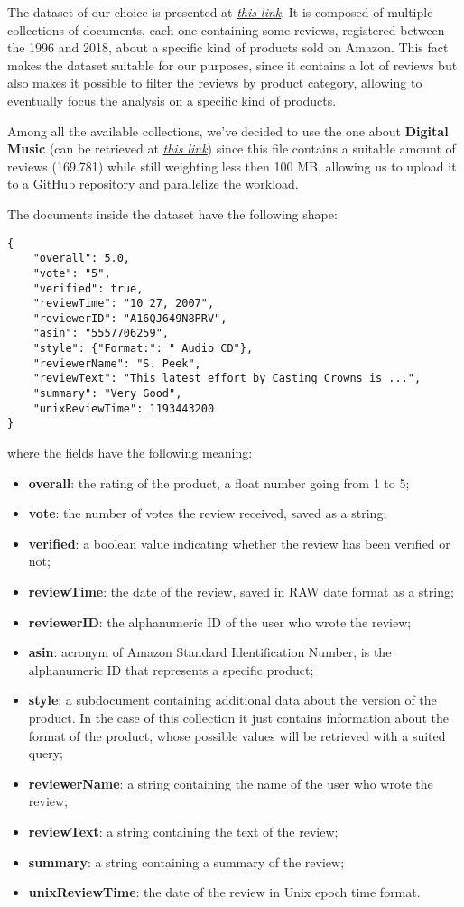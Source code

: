 The dataset of our choice is presented at \href{https://nijianmo.github.io/amazon/index.html}{\textit{this link}}. It is composed of multiple collections of documents, each one containing some reviews, registered between the 1996 and 2018, about a specific kind of products sold on Amazon. This fact makes the dataset suitable for our purposes, since it contains a lot of reviews but also makes it possible to filter the reviews by product category, allowing to eventually focus the analysis on a specific kind of products.

Among all the available collections, we've decided to use the one about \textbf{Digital Music} (can be retrieved at \href{https://jmcauley.ucsd.edu/data/amazon_v2/categoryFilesSmall/Digital_Music_5.json.gz}{\textit{this link}}) since this file contains a suitable amount of reviews (169.781) while still weighting less then 100 MB, allowing us to upload it to a GitHub repository and parallelize the workload.

The documents inside the dataset have the following shape: \\
\begin{verbatim}
{
    "overall": 5.0, 
    "vote": "5", 
    "verified": true, 
    "reviewTime": "10 27, 2007", 
    "reviewerID": "A16QJ649N8PRV", 
    "asin": "5557706259", 
    "style": {"Format:": " Audio CD"}, 
    "reviewerName": "S. Peek", 
    "reviewText": "This latest effort by Casting Crowns is ...", 
    "summary": "Very Good", 
    "unixReviewTime": 1193443200
}
\end{verbatim}

where the fields have the following meaning:
\begin{itemize}
    \item \textbf{overall}: the rating of the product, a float number going from 1 to 5;
    \item \textbf{vote}: the number of votes the review received, saved as a string;
    \item \textbf{verified}: a boolean value indicating whether the review has been verified or not;
    \item \textbf{reviewTime}: the date of the review, saved in RAW date format as a string;
    \item \textbf{reviewerID}: the alphanumeric ID of the user who wrote the review;
    \item \textbf{asin}: acronym of Amazon Standard Identification Number, is the alphanumeric ID that represents a specific product;
    \item \textbf{style}: a subdocument containing additional data about the version of the product. In the case of this collection it just contains information about the format of the product, whose possible values will be retrieved with a suited query;
    \item \textbf{reviewerName}: a string containing the name of the user who wrote the review;
    \item \textbf{reviewText}: a string containing the text of the review;
    \item \textbf{summary}: a string containing a summary of the review;
    \item \textbf{unixReviewTime}: the date of the review in Unix epoch time format.
\end{itemize}